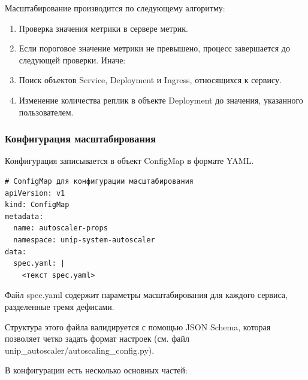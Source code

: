 \documentclass[a4paper]{article}
\begin{document}
Масштабирование производится по следующему алгоритму:

\begin{enumerate}
  \item Проверка значения метрики в сервере метрик.
  \item Если пороговое значение метрики не превышено, процесс
    завершается до следующей проверки. Иначе:
  \item Поиск объектов Service, Deployment и Ingress, относящихся к сервису.
  \item Изменение количества реплик в объекте Deployment до
    значения, указанного пользователем.
\end{enumerate}

\subsubsection{Конфигурация масштабирования}

Конфигурация записывается в объект ConfigMap в формате YAML.

\begin{verbatim}
# ConfigMap для конфигурации масштабирования
apiVersion: v1
kind: ConfigMap
metadata:
  name: autoscaler-props
  namespace: unip-system-autoscaler
data:
  spec.yaml: |
    <текст spec.yaml>
\end{verbatim}

Файл spec.yaml содержит параметры масштабирования для каждого
сервиса, разделенные тремя дефисами.

Структура этого файла валидируется с помощью JSON Schema, которая
позволяет четко задать формат настроек (см. файл
unip\_autoscaler/autoscaling\_config.py).

В конфигурации есть несколько основных частей:
\end{document}
